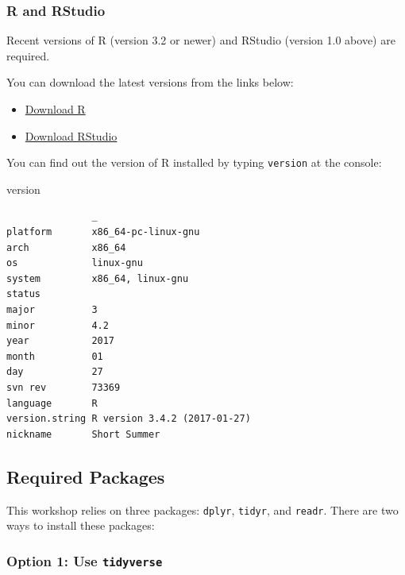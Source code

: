 \documentclass[]{article}
\newenvironment{Shaded}{\begin{snugshade}}{\end{snugshade}}
\newcommand{\NormalTok}[1]{{#1}}
\providecommand{\tightlist}{%
  \setlength{\itemsep}{0pt}\setlength{\parskip}{0pt}}
\theoremstyle{definition}
\theoremstyle{definition}
\theoremstyle{definition}
\theoremstyle{remark}
\begin{document}
\subsubsection{R and RStudio}\label{r-and-rstudio}

Recent versions of R (version 3.2 or newer) and RStudio (version 1.0
above) are required.

You can download the latest versions from the links below:

\begin{itemize}
\tightlist
\item
  \href{https://cran.r-project.org}{Download R}
\item
  \href{https://www.rstudio.com/products/rstudio/download}{Download
  RStudio}
\end{itemize}

You can find out the version of R installed by typing \texttt{version}
at the console:

\begin{Shaded}
\begin{Highlighting}[]
\NormalTok{version}
\end{Highlighting}
\end{Shaded}

\begin{verbatim}
               _                           
platform       x86_64-pc-linux-gnu         
arch           x86_64                      
os             linux-gnu                   
system         x86_64, linux-gnu           
status                                     
major          3                           
minor          4.2                         
year           2017                        
month          01                          
day            27                          
svn rev        73369                       
language       R                           
version.string R version 3.4.2 (2017-01-27)
nickname       Short Summer                
\end{verbatim}

\subsection{Required Packages}\label{required-packages}

This workshop relies on three packages: \texttt{dplyr}, \texttt{tidyr},
and \texttt{readr}. There are two ways to install these packages:

\subsubsection{\texorpdfstring{Option 1: Use
\texttt{tidyverse}}{Option 1: Use tidyverse}}\label{option-1-use-tidyverse}
\end{document}
